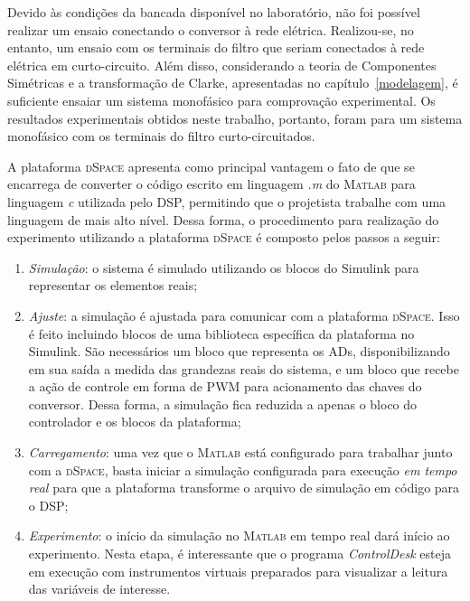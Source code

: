   Devido às condições da bancada disponível no laboratório, não foi possível realizar um ensaio conectando o conversor à rede elétrica. Realizou-se, no entanto, um ensaio com os terminais do filtro que seriam conectados à rede elétrica em curto-circuito. Além disso, considerando a teoria de Componentes Simétricas e a transformação de Clarke, apresentadas no capítulo~\ref{modelagem}, é suficiente ensaiar um sistema monofásico para comprovação experimental. Os resultados experimentais obtidos neste trabalho, portanto, foram para um sistema monofásico com os terminais do filtro curto-circuitados.

  A plataforma \textsc{dSpace} apresenta como principal vantagem o fato de que se encarrega de converter o código escrito em linguagem \emph{.m} do \textsc{Matlab} para linguagem \emph{c} utilizada pelo DSP, permitindo que o projetista trabalhe com uma linguagem de mais alto nível. Dessa forma, o procedimento para realização do experimento utilizando a plataforma \textsc{dSpace} é composto pelos passos a seguir:
  \begin{enumerate}
    \item \textit{Simulação}: o sistema é simulado utilizando os blocos do Simulink para representar os elementos reais;
    \item \textit{Ajuste}: a simulação é ajustada para comunicar com a plataforma \textsc{dSpace}. Isso é feito incluindo blocos de uma biblioteca específica da plataforma no Simulink. São necessários um bloco que representa os ADs, disponibilizando em sua saída a medida das grandezas reais do sistema, e um bloco que recebe a ação de controle em forma de PWM para acionamento das chaves do conversor. Dessa forma, a simulação fica reduzida a apenas o bloco do controlador e os blocos da plataforma;
    \item \textit{Carregamento}: uma vez que o \textsc{Matlab} está configurado para trabalhar junto com a \textsc{dSpace}, basta iniciar a simulação configurada para execução \emph{em tempo real} para que a plataforma transforme o arquivo de simulação em código para o DSP;
    \item \textit{Experimento}: o início da simulação no \textsc{Matlab} em tempo real dará início ao experimento. Nesta etapa, é interessante que o programa \emph{ControlDesk} esteja em execução com instrumentos virtuais preparados para visualizar a leitura das variáveis de interesse.
  \end{enumerate}


